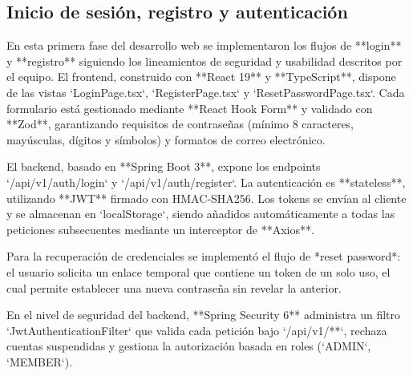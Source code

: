 \subsection{Inicio de sesión, registro y autenticación}
\label{subsec:autenticacion_registro}

En esta primera fase del desarrollo web se implementaron los flujos de **login** y **registro** siguiendo los lineamientos de seguridad y usabilidad descritos por el equipo. El frontend, construido con **React 19** y **TypeScript**, dispone de las vistas `LoginPage.tsx`, `RegisterPage.tsx` y `ResetPasswordPage.tsx`. Cada formulario está gestionado mediante **React Hook Form** y validado con **Zod**, garantizando requisitos de contraseñas (mínimo 8 caracteres, mayúsculas, dígitos y símbolos) y formatos de correo electrónico.

El backend, basado en **Spring Boot 3**, expone los endpoints `/api/v1/auth/login` y `/api/v1/auth/register`. La autenticación es **stateless**, utilizando **JWT** firmado con HMAC‑SHA256. Los tokens se envían al cliente y se almacenan en `localStorage`, siendo añadidos automáticamente a todas las peticiones subsecuentes mediante un interceptor de **Axios**.

Para la recuperación de credenciales se implementó el flujo de *reset password*: el usuario solicita un enlace temporal que contiene un token de un solo uso, el cual permite establecer una nueva contraseña sin revelar la anterior.

En el nivel de seguridad del backend, **Spring Security 6** administra un filtro `JwtAuthenticationFilter` que valida cada petición bajo `/api/v1/**`, rechaza cuentas suspendidas y gestiona la autorización basada en roles (`ADMIN`, `MEMBER`).
